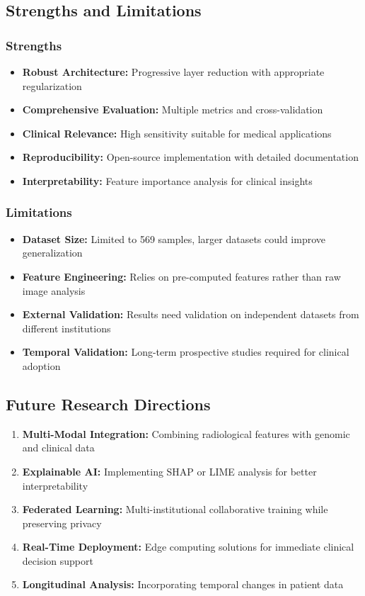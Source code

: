 \documentclass[12pt,a4paper]{article}
\begin{document}
\subsection{Strengths and Limitations}

\subsubsection{Strengths}
\begin{itemize}
    \item \textbf{Robust Architecture:} Progressive layer reduction with appropriate regularization
    \item \textbf{Comprehensive Evaluation:} Multiple metrics and cross-validation
    \item \textbf{Clinical Relevance:} High sensitivity suitable for medical applications
    \item \textbf{Reproducibility:} Open-source implementation with detailed documentation
    \item \textbf{Interpretability:} Feature importance analysis for clinical insights
\end{itemize}

\subsubsection{Limitations}
\begin{itemize}
    \item \textbf{Dataset Size:} Limited to 569 samples, larger datasets could improve generalization
    \item \textbf{Feature Engineering:} Relies on pre-computed features rather than raw image analysis
    \item \textbf{External Validation:} Results need validation on independent datasets from different institutions
    \item \textbf{Temporal Validation:} Long-term prospective studies required for clinical adoption
\end{itemize}

\subsection{Future Research Directions}

\begin{enumerate}
    \item \textbf{Multi-Modal Integration:} Combining radiological features with genomic and clinical data
    \item \textbf{Explainable AI:} Implementing SHAP or LIME analysis for better interpretability
    \item \textbf{Federated Learning:} Multi-institutional collaborative training while preserving privacy
    \item \textbf{Real-Time Deployment:} Edge computing solutions for immediate clinical decision support
    \item \textbf{Longitudinal Analysis:} Incorporating temporal changes in patient data
\end{enumerate}
\end{document}
